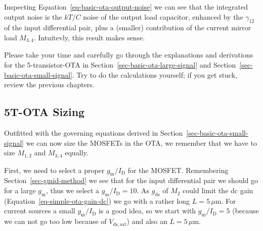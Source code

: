 \documentclass[
  a4paper,
  DIV=11,
  numbers=noendperiod]{scrartcl}
\begin{document}
Inspecting Equation~\ref{eq-basic-ota-output-noise} we can see that the
integrated output noise is the \(k T / C\) noise of the output load
capacitor, enhanced by the \(\gamma_{12}\) of the input differential
pair, plus a (smaller) contribution of the current mirror load
\(M_{3,4}\). Intuitevly, this result makes sense.

\begin{tcolorbox}[enhanced jigsaw, breakable, title=\textcolor{quarto-callout-tip-color}{\faLightbulb}\hspace{0.5em}{Exercise: Derivation of 5T-OTA Performance}, left=2mm, bottomrule=.15mm, opacitybacktitle=0.6, opacityback=0, colframe=quarto-callout-tip-color-frame, leftrule=.75mm, bottomtitle=1mm, colbacktitle=quarto-callout-tip-color!10!white, toprule=.15mm, rightrule=.15mm, toptitle=1mm, titlerule=0mm, arc=.35mm, colback=white, coltitle=black]

Please take your time and carefully go through the explanations and
derivations for the 5-transistor-OTA in
Section~\ref{sec-basic-ota-large-signal} and
Section~\ref{sec-basic-ota-small-signal}. Try to do the calculations
yourself; if you get stuck, review the previous chapters.

\end{tcolorbox}

\subsection{5T-OTA Sizing}\label{t-ota-sizing}

Outfitted with the governing equations derived in
Section~\ref{sec-basic-ota-small-signal} we can now size the MOSFETs in
the OTA, we remember that we have to size \(M_{1,2}\) and \(M_{3,4}\)
equally.

First, we need to select a proper \(g_\mathrm{m}/I_\mathrm{D}\) for the
MOSFET. Remembering Section~\ref{sec-gmid-method} we see that for the
input differential pair we should go for a large \(g_\mathrm{m}\), thus
we select a \(g_\mathrm{m}/I_\mathrm{D}= 10\). As \(g_\mathrm{ds}\) of
\(M_2\) could limit the dc gain (Equation~\ref{eq-simple-ota-gain-dc})
we go with a rather long \(L = 5\,\mu\text{m}\). For current sources a
small \(g_\mathrm{m}/I_\mathrm{D}\) is a good idea, so we start with
\(g_\mathrm{m}/I_\mathrm{D}=5\) (because we can not go too low because
of \(V_\mathrm{ds,sat}\)) and also an \(L = 5\,\mu\text{m}\).
\end{document}

